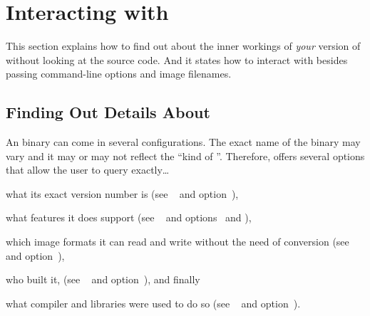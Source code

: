 

\section[Interacting with \App\commonpart]{\label{sec:interaction}%
  Interacting with \App\commonpart}

This section explains how to find out about the inner workings of \emph{your} version of \App{}
without looking at the source code.  And it states how to interact with \App{} besides passing
command-line options and image filenames.


\subsection[Finding Out Details]{\label{sec:finding-out-details}%
  Finding Out Details About \app}

An \appcmd{} binary can come in several configurations.  The exact name of the binary may vary
and it may or may not reflect the ``kind of \app''.  Therefore, \appcmd{} offers several options
that allow the user to query exactly\dots

\begin{compactitemize}
\item
  what its exact version number is (see \sectionabbr~ and
  option~),

\item
  what features it does support (see \sectionabbr~ and
  options~ and
  ),

\item
  which image formats it can read and write without the need of conversion (see
  \sectionabbr~ and
  option~),

\item
  who built it, (see \sectionabbr~ and
  option~), and finally

\item
  what compiler and libraries were used to do so (see
  \sectionabbr~ and
  option~).
\end{compactitemize}

